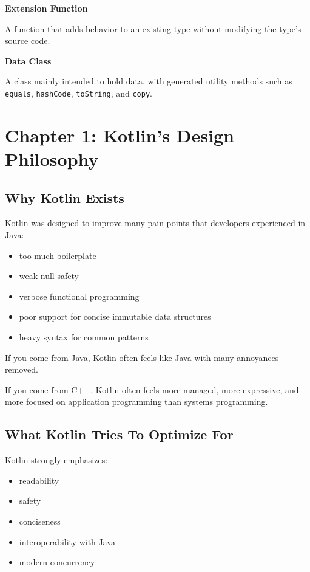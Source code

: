 \documentclass[11pt,a4paper]{article}
\begin{document}
\textbf{Extension Function}

A function that adds behavior to an existing type without modifying the type's source code.

\textbf{Data Class}

A class mainly intended to hold data, with generated utility methods such as \texttt{equals}, \texttt{hashCode}, \texttt{toString}, and \texttt{copy}.

\section{Chapter 1: Kotlin's Design Philosophy}

\subsection{Why Kotlin Exists}

Kotlin was designed to improve many pain points that developers experienced in Java:
\begin{itemize}
    \item too much boilerplate
    \item weak null safety
    \item verbose functional programming
    \item poor support for concise immutable data structures
    \item heavy syntax for common patterns
\end{itemize}

If you come from Java, Kotlin often feels like Java with many annoyances removed.

If you come from C++, Kotlin often feels more managed, more expressive, and more focused on application programming than systems programming.

\subsection{What Kotlin Tries To Optimize For}

Kotlin strongly emphasizes:
\begin{itemize}
    \item readability
    \item safety
    \item conciseness
    \item interoperability with Java
    \item modern concurrency
\end{itemize}
\end{document}
